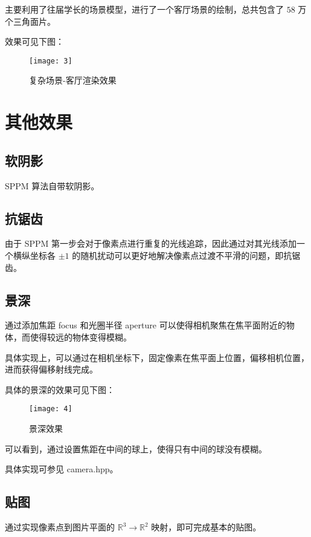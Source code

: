 \documentclass[a4paper]{article}
\begin{document}
    主要利用了往届学长的场景模型，进行了一个客厅场景的绘制，总共包含了 $58$ 万个三角面片。

    效果可见下图：

    \begin{figure}[h]
        \centering
        \texttt{[image: 3]}
        \caption{复杂场景-客厅渲染效果}
        \label{fig3}
    \end{figure}

    \newpage
    \section{其他效果}

    \subsection{软阴影}

    SPPM 算法自带软阴影。

    \subsection{抗锯齿}

    由于 SPPM 第一步会对于像素点进行重复的光线追踪，因此通过对其光线添加一个横纵坐标各 $\pm 1$ 的随机扰动可以更好地解决像素点过渡不平滑的问题，即抗锯齿。

    \subsection{景深}

    通过添加焦距 focus 和光圈半径 aperture 可以使得相机聚焦在焦平面附近的物体，而使得较远的物体变得模糊。

    具体实现上，可以通过在相机坐标下，固定像素在焦平面上位置，偏移相机位置，进而获得偏移射线完成。

    具体的景深的效果可见下图：

    \begin{figure}[h]
        \centering
        \texttt{[image: 4]}
        \caption{景深效果}
        \label{fig4}
    \end{figure}

    可以看到，通过设置焦距在中间的球上，使得只有中间的球没有模糊。

    具体实现可参见 camera.hpp。

    \subsection{贴图}
    通过实现像素点到图片平面的 $\mathbb{R}^3 \to \mathbb{R}^2$ 映射，即可完成基本的贴图。
\end{document}
